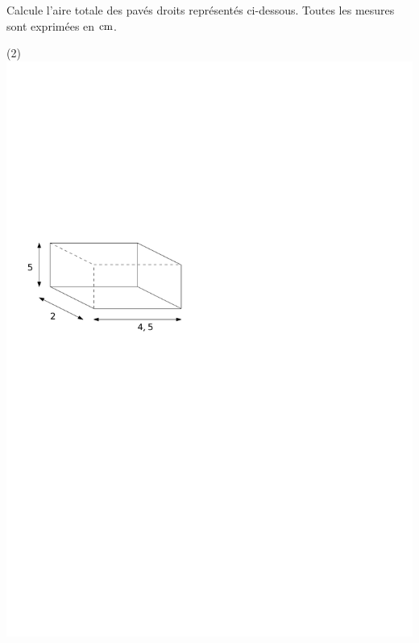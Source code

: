 \documentclass[a4paper,11pt]{report}
\begin{document}
\begin{exo}{
Calcule l'aire totale des pavés droits représentés ci-dessous. Toutes les mesures sont exprimées en $\tunit{}{\centi m}$.

\begin{tasks}(2)
    \task ~\\ \includegraphics[scale=0.5]{media/gm-02/pave1.pdf}

\end{tasks}}
\end{exo}
\end{document}

